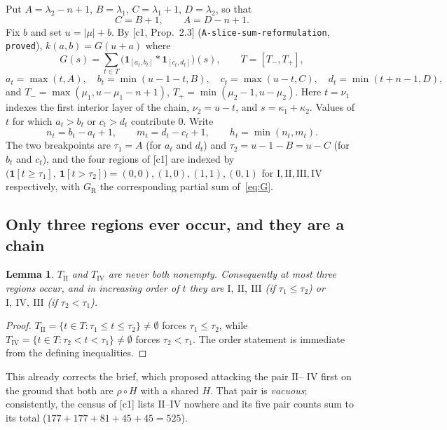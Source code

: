 \documentclass[11pt]{article}
\newtheorem{lemma}[theorem]{Lemma}
\theoremstyle{definition}
\begin{document}
Put $A=\lambda_2-n+1$, $B=\lambda_1$, $C=\lambda_1+1$, $D=\lambda_2$, so that
\begin{equation}\label{eq:AD}
  C=B+1,\qquad A=D-n+1 .
\end{equation}
Fix $b$ and set $u=|\mu|+b$. By [c1, Prop.~2.3] (\texttt{A-slice-sum-reformulation},
\texttt{proved}), $k(a,b)=G(u+a)$ where
\begin{equation}\label{eq:G}
  G(s)=\sum_{t\in T}\bigl(\mathbf 1_{[a_t,b_t]}*\mathbf 1_{[c_t,d_t]}\bigr)(s),
  \qquad T=[T_-,T_+],
\end{equation}
\begin{equation}\label{eq:endpoints}
  a_t=\max(t,A),\quad b_t=\min(u-1-t,B),\quad c_t=\max(u-t,C),\quad d_t=\min(t+n-1,D),
\end{equation}
and $T_-=\max(\mu_1,u-\mu_1-n+1)$, $T_+=\min(\mu_2-1,u-\mu_2)$. Here $t=\nu_1$ indexes the
first interior layer of the chain, $\nu_2=u-t$, and $s=\kappa_1+\kappa_2$. Values of $t$ for
which $a_t>b_t$ or $c_t>d_t$ contribute $0$. Write
\[
  n_t=b_t-a_t+1,\qquad m_t=d_t-c_t+1,\qquad h_t=\min(n_t,m_t).
\]
The two breakpoints are $\tau_1=A$ (for $a_t$ and $d_t$) and $\tau_2=u-1-B=u-C$ (for $b_t$
and $c_t$), and the four regions of [c1] are indexed by
$\bigl(\mathbf 1[t\ge\tau_1],\ \mathbf 1[t>\tau_2]\bigr)=(0,0),(1,0),(1,1),(0,1)$ for
$\mathrm I,\mathrm{II},\mathrm{III},\mathrm{IV}$ respectively, with $G_{\mathrm R}$ the
corresponding partial sum of~\eqref{eq:G}.

\subsection{Only three regions ever occur, and they are a chain}

\begin{lemma}\label{lem:threeregions}
$T_{\mathrm{II}}$ and $T_{\mathrm{IV}}$ are never both nonempty. Consequently at most three
regions occur, and in increasing order of $t$ they are
$\mathrm I,\ \mathrm{II},\ \mathrm{III}$ \textup{(if $\tau_1\le\tau_2$)} or
$\mathrm I,\ \mathrm{IV},\ \mathrm{III}$ \textup{(if $\tau_2<\tau_1$)}.
\end{lemma}
\begin{proof}
$T_{\mathrm{II}}=\{t\in T:\tau_1\le t\le\tau_2\}\ne\emptyset$ forces $\tau_1\le\tau_2$,
while $T_{\mathrm{IV}}=\{t\in T:\tau_2<t<\tau_1\}\ne\emptyset$ forces $\tau_2<\tau_1$.
The order statement is immediate from the defining inequalities.
\end{proof}

This already corrects the brief, which proposed attacking the pair $\mathrm{II}$--%
$\mathrm{IV}$ first on the ground that both are $\rho\circ H$ with a shared $H$. That pair
is \emph{vacuous}; consistently, the census of [c1] lists $\mathrm{II}$--$\mathrm{IV}$
nowhere and its five pair counts sum to its total ($177+177+81+45+45=525$).
\end{document}
